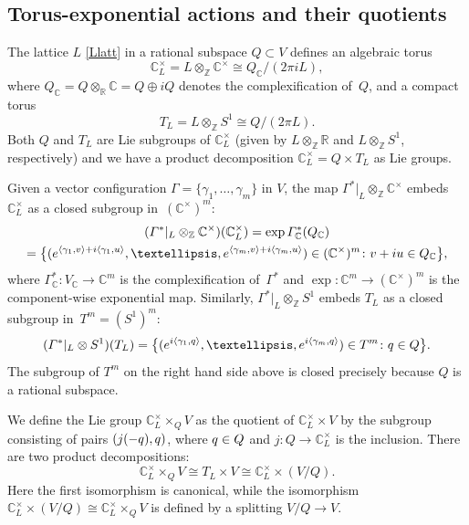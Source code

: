 \documentclass[a4paper]{amsart}
\theoremstyle{definition}
\theoremstyle{remark}
\numberwithin{equation}{section}
\def\R{\mathbb R}
\def\C{\mathbb C}
\def\R{\mathbb R}
\def\Z{\mathbb Z}
\newcommand{\mb}[1]{{\textbf {\textit#1}}}
\newcommand{\<}{\langle}
\renewcommand{\>}{\rangle}
\begin{document}
\subsection{Torus-exponential actions and their quotients}
The lattice $L$ \eqref{Llatt} in a rational subspace $Q\subset V$ defines an algebraic torus 
\[
  \C^\times_L=L\otimes_\Z\C^\times\cong Q_\C/(2\pi i L),
\]  
where $Q_\C=Q\otimes_\R\C=Q\oplus iQ$ denotes the complexification of~$Q$,  and a compact torus
\[
  T_L=L\otimes_\Z S^1 \cong Q/(2\pi L).
\]  
Both $Q$ and $T_L$ are Lie subgroups of $\C^\times_L$ (given by $L\otimes_\Z\R$ and $L\otimes_\Z S^1$, respectively) and we have a product decomposition $\C^\times_L=Q\times T_L$ as Lie groups.

Given a vector configuration $\Gamma=\{\gamma_1,\ldots,\gamma_m\}$ in $V$,
the map $\varGamma^*|_L\otimes_\Z\C^\times$ embeds $\C^\times_L$ as a closed  subgroup in~$(\C^\times)^m$:
\begin{multline}\label{cqsub}
  (\varGamma^*|_L\otimes_\Z\C^\times)
  (\C^\times_L)=\exp\varGamma^*_\C(Q_\C)\\
  =
  \bigl\{(e^{\langle\gamma_1,\mb v\rangle+i\langle\gamma_1,\mb u\rangle},
  \ldots,e^{\langle\gamma_m,\mb v\rangle+i\langle\gamma_m,\mb u\rangle})
  \in(\C^\times)^m  
  \colon \mb v+i\mb u\in Q_\C\bigr\},
\end{multline}
where $\varGamma^*_\C\colon V_\C\to\C^m$ is the complexification of~$\varGamma^*$ and $\exp\colon\C^m\to(\C^\times)^m$ is the component-wise exponential map. Similarly, $\varGamma^*|_L\otimes_\Z S^1$ embeds $T_L$ as a closed subgroup in~$T^m=(S^1)^m$:
\[
  (\varGamma^*|_L\otimes S^1)(T_L)  = 
  \bigl\{(e^{i\langle\gamma_1,\mb q\rangle},
  \ldots,e^{i\langle\gamma_m,\mb q\rangle})
  \in T^m  \colon \mb q\in Q\bigr\}.
\]
The subgroup of $T^m$ on the right hand side above is closed precisely because $Q$ is a rational subspace.  

We define the Lie group $\C^\times_L\times_Q V$ as the quotient of 
$\C^\times_L\times V$ by the subgroup consisting of pairs $(j(-\mb q),\mb q)$, 
where $\mb q\in Q$ and $j\colon Q\to\C^\times_L$ is the inclusion. There are two product decompositions:
\[
  \C^\times_L\times_Q V\cong T_L\times V\cong\C^\times_L\times(V/Q).
\]
Here the first isomorphism is canonical, while the isomorphism 
$\C^\times_L\times(V/Q)\cong\C^\times_L\times_Q V$ is defined by a splitting $V/Q\to V$.
\end{document}
